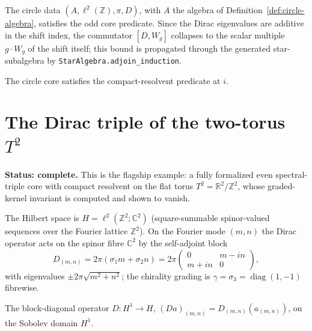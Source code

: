 \begin{theorem}
  \label{thm:circle-isOddSpectralTriple}
  \leanok
  The circle data $(A, \ell^2(\mathbb{Z}), \pi, D)$, with $A$ the algebra of
  Definition~\ref{def:circle-algebra}, satisfies the odd core predicate. Since the Dirac
  eigenvalues are additive in the shift index, the commutator $[D, W_g]$ collapses to the
  scalar multiple $g \cdot W_g$ of the shift itself; this bound is propagated through the generated
  star-subalgebra by \texttt{StarAlgebra.adjoin\_induction}.
\end{theorem}

\begin{theorem}
  \label{thm:circle-isCompactResolventSpectralTriple}
  \leanok
  The circle core satisfies the compact-resolvent predicate at $i$.
\end{theorem}

\section{The Dirac triple of the two-torus \texorpdfstring{$T^2$}{T2}}
\label{sec:torus}

\textbf{Status: complete.} This is the flagship example: a fully formalized even
spectral-triple core with compact resolvent on the flat torus
$T^2 = \mathbb{R}^2/\mathbb{Z}^2$, whose graded-kernel invariant is computed and shown to
vanish.

The Hilbert space is $H = \ell^2(\mathbb{Z}^2; \mathbb{C}^2)$ (square-summable spinor-valued
sequences over the Fourier lattice $\mathbb{Z}^2$). On the Fourier mode $(m, n)$ the Dirac
operator acts on the spinor fibre $\mathbb{C}^2$ by the self-adjoint block
\[
  D_{(m,n)} = 2\pi (\sigma_1 m + \sigma_2 n)
    = 2\pi \begin{pmatrix} 0 & m - in \\ m + in & 0 \end{pmatrix},
\]
with eigenvalues $\pm 2\pi\sqrt{m^2+n^2}$; the chirality grading is $\gamma = \sigma_3 =
\operatorname{diag}(1,-1)$ fibrewise.

\begin{definition}
  \label{def:torus-diracDirac}
  \leanok
  The block-diagonal operator $D \colon H^1 \to H$, $(D a)_{(m,n)} = D_{(m,n)} (a_{(m,n)})$,
  on the Sobolev domain $H^1$.
\end{definition}

